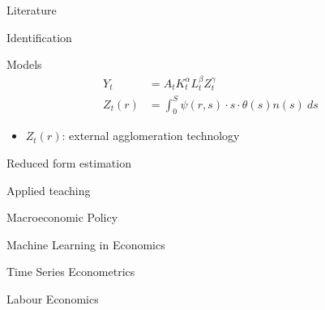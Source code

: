 \documentclass[aspectratio=169]{beamer}
\begin{document}
\begin{frame}{Literature}
\end{frame}

\begin{frame}{Identification}
\end{frame}

\begin{frame}{Models}
    \begin{align}
        Y_t &= A_t K_t^\alpha L_t^\beta Z_t^{\gamma}    \\
        Z_t(r) &= \int_0^S\psi(r,s)\cdot s \cdot \theta(s)n(s)\ ds
    \end{align}
    \begin{itemize}
        \item $Z_t(r)$: external agglomeration technology
    \end{itemize}
\end{frame}

\begin{frame}{Reduced form estimation}

\end{frame}

\begin{frame}{Applied teaching}
    \begin{block}{Macroeconomic Policy}
    
    \end{block}
    \begin{block}{Machine Learning in Economics}
    
    \end{block}
    \begin{block}{Time Series Econometrics}

    \end{block}
    \begin{block}{Labour Economics}
    	\begin{itemize}
            
    	\end{itemize}
    \end{block}
\end{frame}
\end{document}

